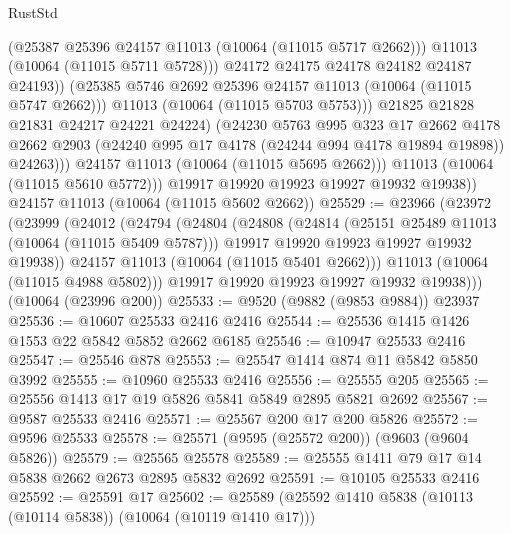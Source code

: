 \begin{lexlean}{RustStd}
\begin{coremodule}
                          (@25387 @25396 @24157 @11013 (@10064 (@11015 @5717 @2662)))
                          @11013
                          (@10064 (@11015 @5711 @5728)))
                        @24172
                        @24175
                        @24178
                        @24182
                        @24187
                        @24193))
                    (@25385 @5746 @2692 @25396 @24157 @11013 (@10064 (@11015 @5747 @2662)))
                    @11013
                    (@10064 (@11015 @5703 @5753)))
                  @21825
                  @21828
                  @21831
                  @24217
                  @24221
                  @24224)
                (@24230
                  @5763
                  @995
                  @323
                  @17
                  @2662
                  @4178
                  @2662
                  @2903
                  (@24240 @995 @17 @4178 (@24244 @994 @4178 @19894 @19898))
                  @24263)))
            @24157
            @11013
            (@10064 (@11015 @5695 @2662)))
          @11013
          (@10064 (@11015 @5610 @5772)))
        @19917
        @19920
        @19923
        @19927
        @19932
        @19938))
    @24157
    @11013
    (@10064 (@11015 @5602 @2662))
@25529 := @23966
    (@23972
      (@23999
        (@24012
          (@24794
            (@24804
              (@24808
                (@24814
                  (@25151 @25489 @11013 (@10064 (@11015 @5409 @5787)))
                  @19917
                  @19920
                  @19923
                  @19927
                  @19932
                  @19938))
              @24157
              @11013
              (@10064 (@11015 @5401 @2662)))
            @11013
            (@10064 (@11015 @4988 @5802)))
          @19917
          @19920
          @19923
          @19927
          @19932
          @19938)))
    (@10064 (@23996 @200))
@25533 := @9520 (@9882 (@9853 @9884)) @23937
@25536 := @10607 @25533 @2416 @2416
@25544 := @25536 @1415 @1426 @1553 @22 @5842 @5852 @2662 @6185
@25546 := @10947 @25533 @2416
@25547 := @25546 @878
@25553 := @25547 @1414 @874 @11 @5842 @5850 @3992
@25555 := @10960 @25533 @2416
@25556 := @25555 @205
@25565 := @25556 @1413 @17 @19 @5826 @5841 @5849 @2895 @5821 @2692
@25567 := @9587 @25533 @2416
@25571 := @25567 @200 @17 @200 @5826
@25572 := @9596 @25533
@25578 := @25571 (@9595 (@25572 @200)) (@9603 (@9604 @5826))
@25579 := @25565 @25578
@25589 := @25555 @1411 @79 @17 @14 @5838 @2662 @2673 @2895 @5832 @2692
@25591 := @10105 @25533 @2416
@25592 := @25591 @17
@25602 := @25589 (@25592 @1410 @5838 (@10113 (@10114 @5838)) (@10064 (@10119 @1410 @17)))

\end{coremodule}
\end{lexlean}
